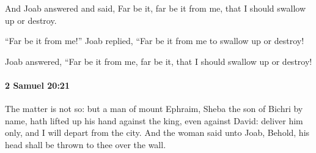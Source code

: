 			\begin{versebox}
					\item[BHS] 
					\item[ASV] And Joab answered and said, Far be it, far be it from me, that I should swallow up or destroy.
					\item[NIV] “Far be it from me!” Joab replied, “Far be it from me to swallow up or destroy!
					\item[NRSV] Joab answered, “Far be it from me, far be it, that I should swallow up or destroy!
			\end{versebox}

		\paragraph{2 Samuel 20:21} %
			\label{2SAMUEL-20-21}

			The matter is not so: but a man of mount Ephraim, Sheba the son of Bichri by name, hath lifted up his hand against the king, even against David: deliver him only, and I will depart from the city. And the woman said unto Joab, Behold, his head shall be thrown to thee over the wall.

